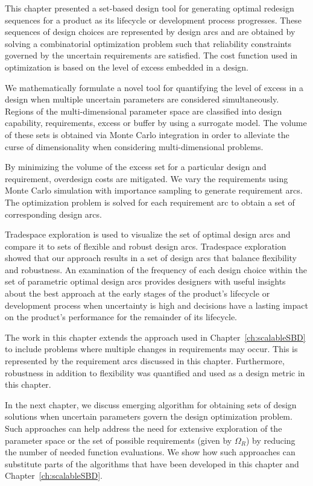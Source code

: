 This chapter presented a set-based design tool for generating optimal redesign sequences for a product as its lifecycle or development process progresses. These sequences of design choices are represented by design arcs and are obtained by solving a combinatorial optimization problem such that reliability constraints governed by the uncertain requirements are satisfied. The cost function used in optimization is based on the level of excess embedded in a design. 

We mathematically formulate a novel tool for quantifying the level of excess in a design when multiple uncertain parameters are considered simultaneously. Regions of the multi-dimensional parameter space are classified into design capability, requirements, excess or buffer by using a surrogate model. The volume of these sets is obtained via Monte Carlo integration in order to alleviate the curse of dimensionality when considering multi-dimensional problems.

By minimizing the volume of the excess set for a particular design and requirement, overdesign costs are mitigated. We vary the requirements using Monte Carlo simulation with importance sampling to generate requirement arcs. The optimization problem is solved for each requirement arc to obtain a set of corresponding design arcs. 

Tradespace exploration is used to visualize the set of optimal design arcs and compare it to sets of flexible and robust design arcs. Tradespace exploration showed that our approach results in a set of design arcs that balance flexibility and robustness. An examination of the frequency of each design choice within the set of parametric optimal design arcs provides designers with useful insights about the best approach at the early stages of the product's lifecycle or development process when uncertainty is high and decisions have a lasting impact on the product's performance for the remainder of its lifecycle.

The work in this chapter extends the approach used in Chapter~\ref{ch:scalableSBD} to include problems where multiple changes in requirements may occur. This is represented by the requirement arcs discussed in this chapter. Furthermore, robustness in addition to flexibility was quantified and used as a design metric in this chapter.

In the next chapter, we discuss emerging algorithm for obtaining sets of design solutions when uncertain parameters govern the design optimization problem. Such approaches can help address the need for extensive exploration of the parameter space or the set of possible requirements (given by $\Omega_R$) by reducing the number of needed function evaluations. We show how such approaches can substitute parts of the algorithms that have been developed in this chapter and Chapter~\ref{ch:scalableSBD}.